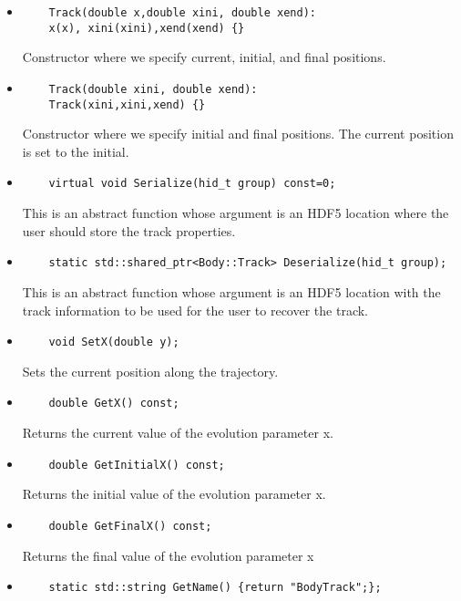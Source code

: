 \documentclass[3p,12pt]{elsarticle}
\newcommand{\ttf}{\ttfamily}
\begin{document}
\begin{itemize}
\item  
  \begin{lstlisting}
    Track(double x,double xini, double xend):
    x(x), xini(xini),xend(xend) {}
  \end{lstlisting}
  Constructor where we specify current, initial, and final positions. 
\item  
  \begin{lstlisting}
    Track(double xini, double xend):
    Track(xini,xini,xend) {}
  \end{lstlisting}
  Constructor where we specify initial and final positions. The
  current position is set to the initial. 
  \item  
  \begin{lstlisting}
    virtual void Serialize(hid_t group) const=0;
  \end{lstlisting}
  This is an abstract function whose argument is an HDF5 location
  where the user should store the track properties.
  \item  
  \begin{lstlisting}
    static std::shared_ptr<Body::Track> Deserialize(hid_t group);
  \end{lstlisting}
  This is an abstract function whose argument is an HDF5 location
  with the track information to be used for the user to recover the track.
\item  
  \begin{lstlisting}
    void SetX(double y);
  \end{lstlisting}
  Sets the current position along the trajectory.  
\item  
  \begin{lstlisting}
    double GetX() const;
  \end{lstlisting}
  Returns the current value of the evolution parameter {\ttf x}.
\item  
  \begin{lstlisting}
    double GetInitialX() const;
  \end{lstlisting}    
  Returns the initial value of the evolution parameter {\ttf x}.
\item  
  \begin{lstlisting}
    double GetFinalX() const;
  \end{lstlisting}          
  Returns the final value of the evolution parameter {\ttf x}
\item  
  \begin{lstlisting}
    static std::string GetName() {return "BodyTrack";};

\end{lstlisting}
\end{itemize}
\end{document}
